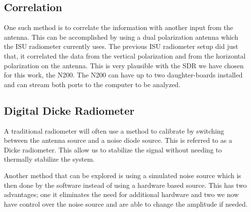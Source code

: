 \subsection{Correlation}  
One such method is to correlate the information with another input from the antenna.  This can be accomplished by using a dual polarization antenna which the ISU radiometer currently uses.  The previous ISU radiometer setup did just that, it correlated the data from the vertical polarization and from the horizontal polarization on the antenna.  This is very plausible with the SDR we have chosen for this work, the N200.  The N200 can have up to two daughter-boards installed and can stream both ports to the computer to be analyzed.  

\subsection{Digital Dicke Radiometer}

A traditional radiometer will often use a method to calibrate by switching between the antenna source and a noise diode source.  This is referred to as a Dicke radiometer.  This allow us to stabilize the signal without needing to thermally stabilize the system.

Another method that can be explored is using a simulated noise source which is then done by the software instead of using a hardware based source.  This has two advantages; one it eliminates the need for additional hardware and two we now have control over the noise source and are able to change the amplitude if needed.